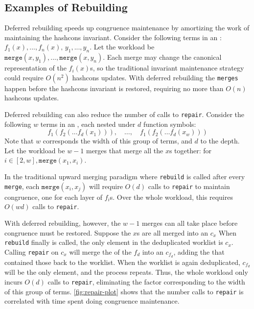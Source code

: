 \subsection{Examples of Rebuilding}

Deferred rebuilding speeds up congruence maintenance by amortizing the work of
  maintaining the hashcons invariant.
Consider the following terms in an \egraph:
  $f_{1}(x), ..., f_{n}(x),\, y_{1}, ..., y_{n}$.
Let the workload be $\texttt{merge}(x, y_{1}), ..., \texttt{merge}(x, y_{n})$.
Each merge may change the canonical representation of the $f_{i}(x)$s,
  so the traditional invariant maintenance strategy
  could require $O(n^{2})$ hashcons updates.
With deferred rebuilding the \texttt{merges} happen before
  the hashcons invariant is restored,
  requiring no more than $O(n)$ hashcons updates.

Deferred rebuilding can also reduce the number of calls to \texttt{repair}.
Consider the following $w$ terms in an \egraph,
  each nested under $d$ function symbols:
  $$f_1 (f_2(\ldots f_d(x_1))), \quad\ldots,\quad f_1(f_2(\ldots f_d(x_w)))$$
Note that $w$ corresponds the width of this group of terms, and $d$ to the depth.
Let the workload be $w-1$ merges that merge all the $x$s together:
  for $i \in [2, w], \texttt{merge}(x_{1}, x_{i})$.

In the traditional upward merging paradigm
  where \texttt{rebuild} is called after every \texttt{merge},
  each $\texttt{merge}(x_i, x_j)$ will require $O(d)$ calls to \texttt{repair}
  to maintain congruence, one for each layer of $f_{i}$s.
Over the whole workload, this requires $O(wd)$ calls to \texttt{repair}.

With deferred rebuilding, however, the $w-1$ merges can all take place before
  congruence must be restored.
Suppose the $x$s are all merged into an \eclass $c_{x}$
When \texttt{rebuild} finally is called,
  the only element in the deduplicated worklist is $c_{x}$.
Calling \texttt{repair} on $c_{x}$ will merge the \eclasses of the $f_{d}$
  \enodes into an \eclass $c_{f_{d}}$,
  adding the \eclasses that contained those \enodes back to the worklist.
When the worklist is again deduplicated,
  $c_{f_{d}}$ will be the only element,
  and the process repeats.
Thus, the whole workload only incurs $O(d)$ calls to \texttt{repair},
  eliminating the factor corresponding to the width of this group of terms.
\autoref{fig:repair-plot} shows that the number calls to \texttt{repair} is
  correlated with time spent doing congruence maintenance.


